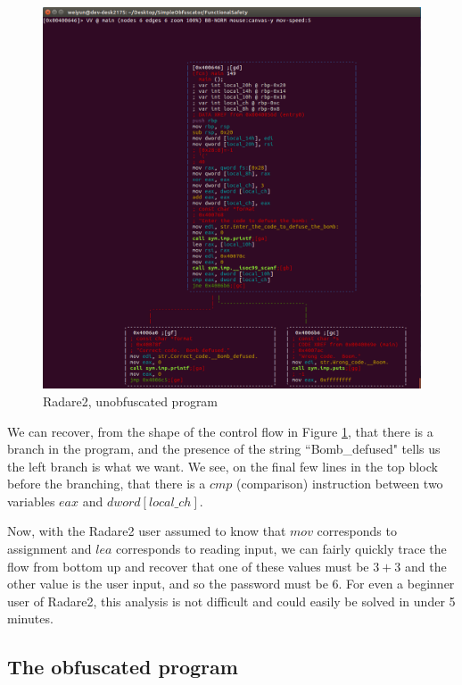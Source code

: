 \documentclass[12pt,notitlepage]{report}
\theoremstyle{plain}
\theoremstyle{definition}
\numberwithin{equation}{section}
\begin{document}
\begin{figure}[H]
    \centering
    \includegraphics[scale=0.42]{r2simple}
    \caption{Radare2, unobfuscated program}
    \label{fig:radare}
\end{figure}

We can recover, from the shape of the control flow in Figure \ref{fig:radare}, that there is a branch in the program, and the presence of the string ``Bomb\_defused" tells us the left branch is what we want.  We see, on the final few lines in the top block before the branching, that there is a $cmp$ (comparison) instruction between two variables $eax$ and $dword [local\_ch]$.

\par Now, with the Radare2 user assumed to know that $mov$ corresponds to assignment and $lea$ corresponds to reading input, we can fairly quickly trace the flow from bottom up and recover that one of these values must be $3+3$ and the other value is the user input, and so the password must be 6.  For even a beginner user of Radare2, this analysis is not difficult and could easily be solved in under 5 minutes.

\subsection{The obfuscated program}
\end{document}
